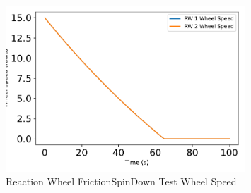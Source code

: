 \begin{figure}[htbp]\centerline{\includegraphics[width=0.8\textwidth]{AutoTeX/ReactionWheelFrictionSpinDownTestWheelSpeed}}\caption{Reaction Wheel FrictionSpinDown Test Wheel Speed}\label{fig:ReactionWheelFrictionSpinDownTestWheelSpeed}\end{figure}